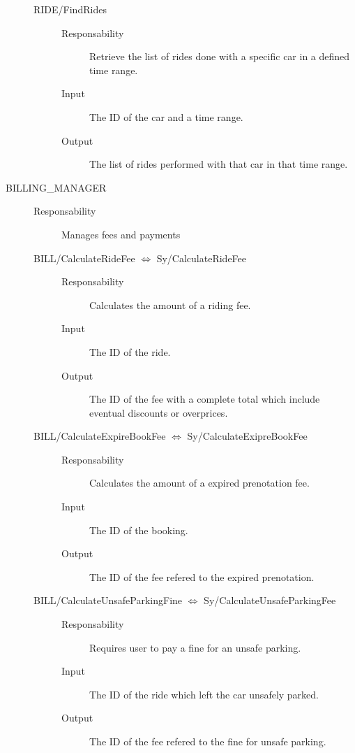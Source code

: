 \documentclass[11pt]{article} %
\begin{document}
\begin{description}
\begin{description}
	\item[RIDE/FindRides] \hfill
		\begin{description}
			\item[Responsability] Retrieve the list of rides done with a specific car in a defined time range.
			\item[Input] The ID of the car and a time range.
			\item[Output] The list of rides performed with that car in that time range.
		\end{description}
	\end{description}
	
	\item[BILLING\_MANAGER] \hfill
	\begin{description}
		\item[Responsability] Manages fees and payments

	\item[BILL/CalculateRideFee $\Leftrightarrow$ Sy/CalculateRideFee] \hfill
		\begin{description}
			\item[Responsability] Calculates the amount of a riding fee.
			\item[Input] The ID of the ride.
			\item[Output] The ID of the fee with a complete total which include eventual discounts or overprices.
		\end{description}

	\item[BILL/CalculateExpireBookFee $\Leftrightarrow$ Sy/CalculateExipreBookFee ] \hfill
		\begin{description}
			\item[Responsability] Calculates the amount of a expired prenotation fee.
			\item[Input] The ID of the booking.
			\item[Output] The ID of the fee refered to the expired prenotation.
		\end{description}

	\item[BILL/CalculateUnsafeParkingFine $\Leftrightarrow$ Sy/CalculateUnsafeParkingFee] \hfill
		\begin{description}
			\item[Responsability] Requires user to pay a fine for an unsafe parking.
			\item[Input] The ID of the ride which left the car unsafely parked.
			\item[Output] The ID of the fee refered to the fine for unsafe parking.
		\end{description}


\end{description}
\end{description}
\end{document}
